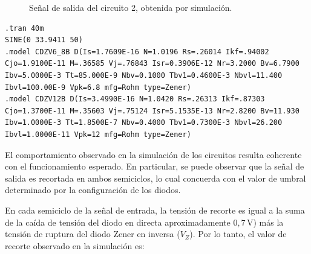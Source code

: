 \begin{figure}[H]
  \centering
  \caption{Señal de salida del circuito 2, obtenida por simulación.}
  \label{fig:RecortadorB}
\end{figure}

\begin{lstlisting}[style=ltspice, caption={Parámetros de simulación LTspice}]
.tran 40m
SINE(0 33.9411 50)
.model CDZV6_8B D(Is=1.7609E-16 N=1.0196 Rs=.26014 Ikf=.94002 Cjo=1.9100E-11 M=.36585 Vj=.76843 Isr=0.3906E-12 Nr=3.2000 Bv=6.7900 Ibv=5.0000E-3 Tt=85.000E-9 Nbv=0.1000 Tbv1=0.4600E-3 Nbvl=11.400 Ibvl=100.00E-9 Vpk=6.8 mfg=Rohm type=Zener)
.model CDZV12B D(Is=3.4990E-16 N=1.0420 Rs=.26313 Ikf=.87303 Cjo=1.3700E-11 M=.35603 Vj=.75124 Isr=5.1535E-13 Nr=2.8200 Bv=11.930 Ibv=1.0000E-3 Tt=1.8500E-7 Nbv=0.4000 Tbv1=0.7300E-3 Nbvl=26.200 Ibvl=1.0000E-11 Vpk=12 mfg=Rohm type=Zener)
\end{lstlisting}

El comportamiento observado en la simulación de los circuitos resulta coherente con el funcionamiento
esperado. En particular, se puede observar que la señal de salida es recortada en ambos semiciclos,
lo cual concuerda con el valor de umbral determinado por la configuración de los diodos.

En cada semiciclo de la señal de entrada, la tensión de recorte es igual a la suma de la caída de tensión del diodo en directa 
aproximadamente $0{,}7\,\text{V}$) más la tensión de ruptura del diodo Zener en inversa ($V_Z$). Por lo tanto, el valor de recorte
observado en la simulación es:


